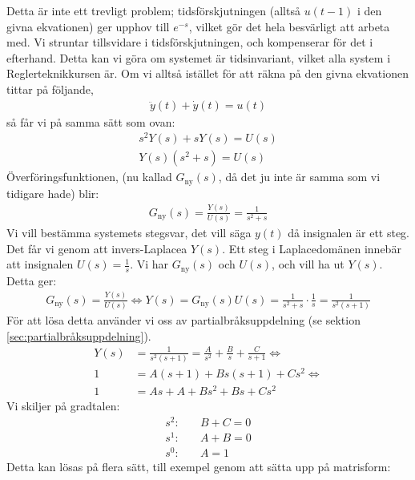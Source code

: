 \documentclass[a4paper]{article}
\begin{document}
Detta är inte ett trevligt problem; tidsförskjutningen (alltså $u(t-1)$ i den givna ekvationen) ger upphov till $e^{-s}$, vilket gör det hela besvärligt att arbeta med. Vi struntar tillsvidare i tidsförskjutningen, och kompenserar för det i efterhand. Detta kan vi göra om systemet är tidsinvariant, vilket alla system i Reglerteknikkursen är. Om vi alltså istället för att räkna på den givna ekvationen tittar på följande,
\begin{align*}
  \ddot{y}(t) + \dot{y}(t) = u(t)
\end{align*}
så får vi på samma sätt som ovan:
\begin{align*}
  s^2Y(s) + sY(s) = U(s) \\
  Y(s)(s^2 + s) = U(s)
\end{align*}
%
Överföringsfunktionen, (nu kallad $G_{\text{ny}}(s)$, då det ju inte är samma som vi tidigare hade) blir:
\begin{align*}
  G_{\text{ny}}(s) = \frac{Y(s)}{U(s)} = \frac{1}{s^2 + s}
\end{align*}
%
Vi vill bestämma systemets stegsvar, det vill säga $y(t)$ då insignalen är ett steg. Det får vi genom att invers-Laplacea $Y(s)$. Ett steg i Laplacedomänen innebär att insignalen $U(s) = \frac{1}{s}$. Vi har $G_{\text{ny}}(s)$ och $U(s)$, och vill ha ut $Y(s)$. Detta ger:
\begin{align*}
  G_{\text{ny}}(s) = \frac{Y(s)}{U(s)} \Longleftrightarrow Y(s) = G_{\text{ny}}(s)U(s) = \frac{1}{s^2 + s} \cdot \frac{1}{s} = \frac{1}{s^2(s + 1)}
\end{align*}
%
För att lösa detta använder vi oss av partialbråksuppdelning (se sektion \ref{sec:partialbråksuppdelning}).
%
\begin{align*}
  Y(s) &= \frac{1}{s^2(s + 1)} = \frac{A}{s^2} + \frac{B}{s} + \frac{C}{s+1} \Longleftrightarrow \\
  1 &= A(s + 1) + Bs(s + 1) + Cs^2 \Longleftrightarrow \\
  1 &= As + A + Bs^2 + Bs + Cs^2
\end{align*}
%
Vi skiljer på gradtalen:
%
\begin{align*}
  s^2: & \quad B + C = 0\\
  s^1: & \quad A + B = 0\\
  s^0: & \quad A     = 1
\end{align*}
%
Detta kan lösas på flera sätt, till exempel genom att sätta upp på matrisform:
%
\end{document}
